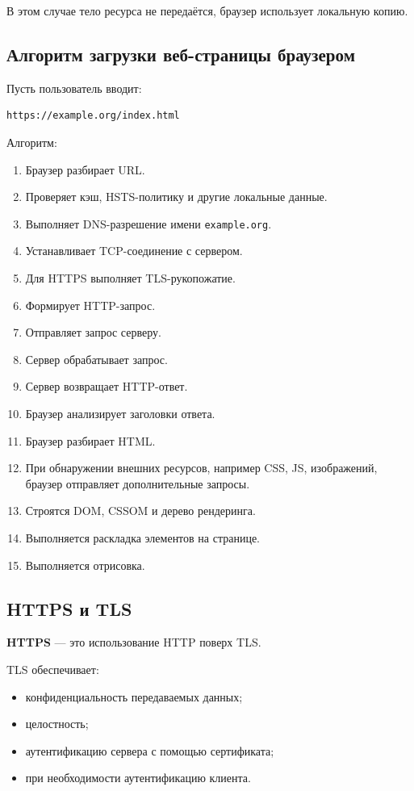 \documentclass[12pt,a4paper]{article}
\begin{document}
В этом случае тело ресурса не передаётся, браузер использует локальную копию.

\subsection{Алгоритм загрузки веб-страницы браузером}

Пусть пользователь вводит:
\begin{lstlisting}
https://example.org/index.html
\end{lstlisting}

Алгоритм:
\begin{enumerate}
    \item Браузер разбирает URL.
    \item Проверяет кэш, HSTS-политику и другие локальные данные.
    \item Выполняет DNS-разрешение имени \texttt{example.org}.
    \item Устанавливает TCP-соединение с сервером.
    \item Для HTTPS выполняет TLS-рукопожатие.
    \item Формирует HTTP-запрос.
    \item Отправляет запрос серверу.
    \item Сервер обрабатывает запрос.
    \item Сервер возвращает HTTP-ответ.
    \item Браузер анализирует заголовки ответа.
    \item Браузер разбирает HTML.
    \item При обнаружении внешних ресурсов, например CSS, JS, изображений, браузер отправляет дополнительные запросы.
    \item Строятся DOM, CSSOM и дерево рендеринга.
    \item Выполняется раскладка элементов на странице.
    \item Выполняется отрисовка.
\end{enumerate}

\subsection{HTTPS и TLS}

\textbf{HTTPS} --- это использование HTTP поверх TLS.

TLS обеспечивает:
\begin{itemize}
    \item конфиденциальность передаваемых данных;
    \item целостность;
    \item аутентификацию сервера с помощью сертификата;
    \item при необходимости аутентификацию клиента.
\end{itemize}
\end{document}

